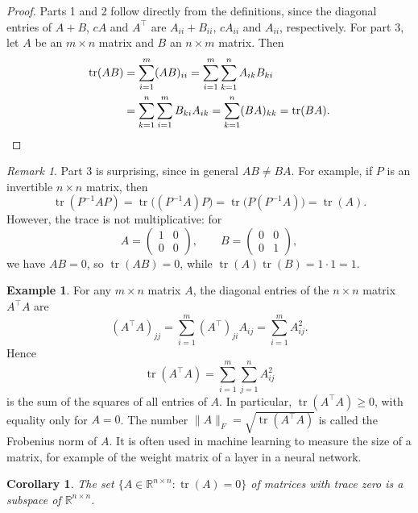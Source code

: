 \documentclass[11pt]{article}
\theoremstyle{definition}
\newtheorem{example}[definition]{Example}
\theoremstyle{plain}
\newtheorem{corollary}[definition]{Corollary}
\theoremstyle{remark}
\newtheorem{remark}[definition]{Remark}
\DeclareMathOperator{\tr}{tr}
\begin{document}
\begin{proof}
    Parts 1 and 2 follow directly from the definitions, since the diagonal entries of $A + B$, $cA$ and $A^\top$ are $A_{ii} + B_{ii}$, $cA_{ii}$ and $A_{ii}$, respectively. For part 3, let $A$ be an $m \times n$ matrix and $B$ an $n \times m$ matrix. Then
    \begin{align*}
        \tr(AB) &= \sum_{i=1}^m (AB)_{ii} = \sum_{i=1}^m \sum_{k=1}^n A_{ik} B_{ki} \\
        &= \sum_{k=1}^n \sum_{i=1}^m B_{ki} A_{ik} = \sum_{k=1}^n (BA)_{kk} = \tr(BA). \qedhere
    \end{align*}
\end{proof}

\begin{remark}
    Part 3 is surprising, since in general $AB \neq BA$. For example, if $P$ is an invertible $n \times n$ matrix, then
    \[\tr(P^{-1}AP) = \tr\big((P^{-1}A)P\big) = \tr\big(P(P^{-1}A)\big) = \tr(A).\]
    However, the trace is not multiplicative: for
    \[A = \begin{pmatrix}
        1 & 0 \\
        0 & 0
    \end{pmatrix}, \qquad B = \begin{pmatrix}
        0 & 0 \\
        0 & 1
    \end{pmatrix},\]
    we have $AB = 0$, so $\tr(AB) = 0$, while $\tr(A) \tr(B) = 1 \cdot 1 = 1$.
\end{remark}

\begin{example}
    For any $m \times n$ matrix $A$, the diagonal entries of the $n \times n$ matrix $A^\top A$ are
    \[(A^\top A)_{jj} = \sum_{i=1}^m (A^\top)_{ji} A_{ij} = \sum_{i=1}^m A_{ij}^2.\]
    Hence
    \[\tr(A^\top A) = \sum_{i=1}^m \sum_{j=1}^n A_{ij}^2\]
    is the sum of the squares of all entries of $A$. In particular, $\tr(A^\top A) \geq 0$, with equality only for $A = 0$. The number $\|A\|_F = \sqrt{\tr(A^\top A)}$ is called the Frobenius norm of $A$. It is often used in machine learning to measure the size of a matrix, for example of the weight matrix of a layer in a neural network.
\end{example}

\begin{corollary}
    The set $\{A \in \mathbb{R}^{n \times n} : \tr(A) = 0\}$ of matrices with trace zero is a subspace of $\mathbb{R}^{n \times n}$.
\end{corollary}
\end{document}

